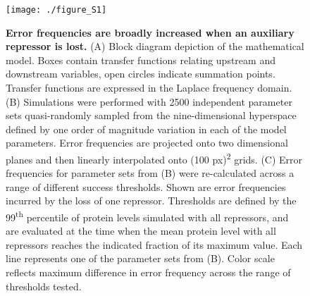 \begin{figure}[h!]
\label{fig:metabolism:figS1}
\centering
\texttt{[image: ./figure\_S1]}
\caption[Error frequencies are broadly increased when an auxiliary repressor is lost.]{\textbf{Error frequencies are broadly increased when an auxiliary repressor is lost.} (A) Block diagram depiction of the mathematical model. Boxes contain transfer functions relating upstream and downstream variables, open circles indicate summation points. Transfer functions are expressed in the Laplace frequency domain. (B) Simulations were performed with 2500 independent parameter sets quasi-randomly sampled from the nine-dimensional hyperspace defined by one order of magnitude variation in each of the model parameters. Error frequencies are projected onto two dimensional planes and then linearly interpolated onto (100 px)\textsuperscript{2} grids. (C) Error frequencies for parameter sets from (B) were re-calculated across a range of different success thresholds. Shown are error frequencies incurred by the loss of one repressor. Thresholds are defined by the 99\textsuperscript{th} percentile of protein levels simulated with all repressors, and are evaluated at the time when the mean protein level with all repressors reaches the indicated fraction of its maximum value. Each line represents one of the parameter sets from (B). Color scale reflects maximum difference in error frequency across the range of thresholds tested.}
\end{figure}

